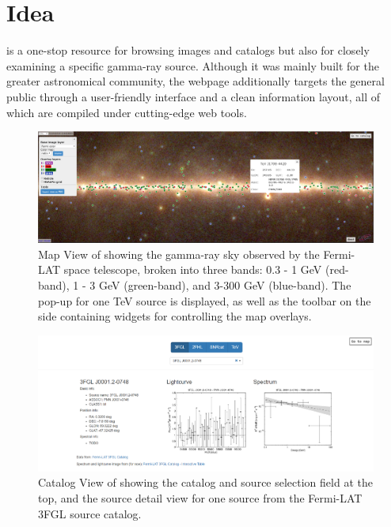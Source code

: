 \section{Idea}

\gammasky is a one-stop resource for browsing images and catalogs but also for closely examining a specific gamma-ray source. Although it was mainly built for the greater astronomical community, the webpage additionally targets the general public through a user-friendly interface and a clean information layout, all of which are compiled under cutting-edge web tools.

\begin{figure}[tb]
\centerline{\includegraphics[width=\textwidth]{figures/mapview_wide}}
\caption{Map View of \gammasky showing the gamma-ray sky observed by the Fermi-LAT space telescope, broken into three bands: 0.3 - 1 GeV (red-band), 1 - 3 GeV (green-band), and 3-300 GeV (blue-band). The pop-up for one TeV source is displayed, as well as the toolbar on the side containing widgets for controlling the map overlays.}
\label{fig:mapview}
\end{figure}

\begin{figure}[tb]
\centerline{\includegraphics[width=\textwidth]{figures/catview_wide_zoom}}
\caption{Catalog View of \gammasky showing the catalog and source selection field at the top, and the source detail view for one source from the Fermi-LAT 3FGL source catalog.}
\label{fig:catview}
\end{figure}


